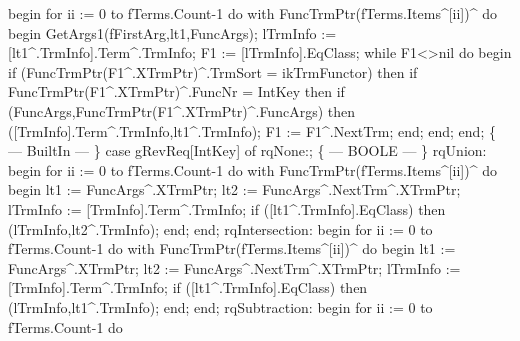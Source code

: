                begin
                  for ii := 0 to fTerms.Count-1 do
                     with FuncTrmPtr(fTerms.Items^[ii])^ do
                  begin
                     GetArgs1(fFirstArg,lt1,FuncArgs);
                     lTrmInfo := [lt1^.TrmInfo].Term^.TrmInfo;
                     F1 := [lTrmInfo].EqClass;
                     while F1<>nil do
                     begin
                        if (FuncTrmPtr(F1^.XTrmPtr)^.TrmSort = ikTrmFunctor) then
                           if FuncTrmPtr(F1^.XTrmPtr)^.FuncNr = IntKey then
                              if (FuncArgs,FuncTrmPtr(F1^.XTrmPtr)^.FuncArgs) then
                                 ([TrmInfo].Term^.TrmInfo,lt1^.TrmInfo);
                        F1 := F1^.NextTrm;
                     end;
                  end;
               end;
            \{ --- BuiltIn --- \}
            case gRevReq[IntKey] of
               rqNone:;
               \{ --- BOOLE --- \}
               rqUnion:
                  begin
                     for ii := 0 to fTerms.Count-1 do
                        with FuncTrmPtr(fTerms.Items^[ii])^ do
                     begin
                        lt1 := FuncArgs^.XTrmPtr; lt2 := FuncArgs^.NextTrm^.XTrmPtr;
                        lTrmInfo := [TrmInfo].Term^.TrmInfo;
                        if ([lt1^.TrmInfo].EqClass) then
                           (lTrmInfo,lt2^.TrmInfo);
                     end;
                  end;
               rqIntersection:
                  begin
                     for ii := 0 to fTerms.Count-1 do
                        with FuncTrmPtr(fTerms.Items^[ii])^ do
                     begin
                        lt1 := FuncArgs^.XTrmPtr; lt2 := FuncArgs^.NextTrm^.XTrmPtr;
                        lTrmInfo := [TrmInfo].Term^.TrmInfo;
                        if ([lt1^.TrmInfo].EqClass) then
                           (lTrmInfo,lt1^.TrmInfo);
                     end;
                  end;
               rqSubtraction:
                  begin
                     for ii := 0 to fTerms.Count-1 do
